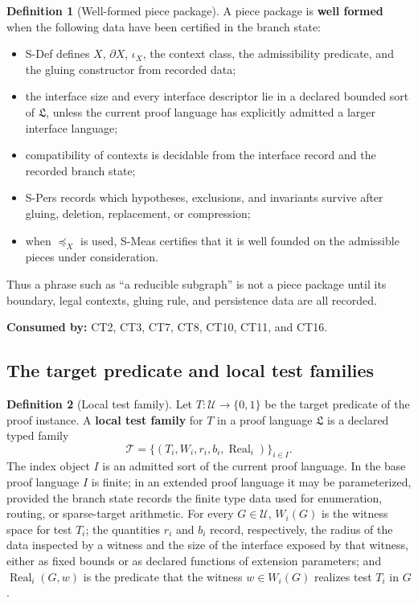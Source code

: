 \documentclass[
  11pt,
]{article}
\providecommand{\tightlist}{%
  \setlength{\itemsep}{0pt}\setlength{\parskip}{0pt}}
\theoremstyle{definition}
\newtheorem{definition}{Definition}[section]
\begin{document}
\begin{definition}[Well-formed piece package]\label{def:well-formed-piece-package}
A piece package is \textbf{well formed} when the following data have
been certified in the branch state:

\begin{itemize}
\tightlist
\item
  S-Def defines \(X\), \(\partial X\), \(\iota_X\), the context class,
  the admissibility predicate, and the gluing constructor from recorded
  data;
\item
  the interface size and every interface descriptor lie in a declared
  bounded sort of \(\mathfrak L\), unless the current proof language has
  explicitly admitted a larger interface language;
\item
  compatibility of contexts is decidable from the interface record and
  the recorded branch state;
\item
  S-Pers records which hypotheses, exclusions, and invariants survive
  after gluing, deletion, replacement, or compression;
\item
  when \(\preceq_X\) is used, S-Meas certifies that it is well founded
  on the admissible pieces under consideration.
\end{itemize}

Thus a phrase such as ``a reducible subgraph'' is not a piece package
until its boundary, legal contexts, gluing rule, and persistence data
are all recorded.
\end{definition}

\noindent\textbf{Consumed by:} CT2, CT3, CT7, CT8, CT10, CT11, and CT16.

\subsection{The target predicate and local test families}\label{data-target-tests}
\begin{definition}[Local test family]\label{def:local-test-family}
Let \(T:\mathcal U\to\{0,1\}\) be the target predicate of the proof
instance.  A \textbf{local test family} for \(T\) in a proof language
\(\mathfrak L\) is a declared typed family
\[
\mathcal T=\{(T_i,W_i,r_i,b_i,\operatorname{Real}_i)\}_{i\in I}.
\]
The index object \(I\) is an admitted sort of the current proof
language.  In the base proof language \(I\) is finite; in an extended
proof language it may be parameterized,
provided the branch state records the finite type data used for
enumeration, routing, or sparse-target arithmetic.  For every
\(G\in\mathcal U\), \(W_i(G)\) is the witness space for test \(T_i\);
the quantities \(r_i\) and \(b_i\) record, respectively, the radius of
the data inspected by a witness and the size of the interface exposed by
that witness, either as fixed bounds or as declared functions of
extension parameters; and
\(\operatorname{Real}_i(G,w)\) is the predicate that the witness
\(w\in W_i(G)\) realizes test \(T_i\) in \(G\).
\end{definition}
\end{document}
